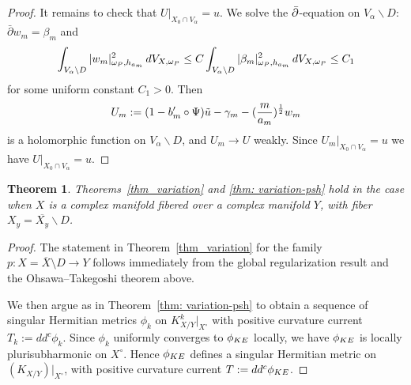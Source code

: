 \documentclass[a4paper, 11pt]{amsart}
\theoremstyle{plain}
\newtheorem{theorem}{Theorem}[section]
\numberwithin{equation}{section} %
\numberwithin{figure}{section} %
\theoremstyle{plain}
\theoremstyle{plain}
\theoremstyle{plain}
\theoremstyle{plain}
\theoremstyle{remark}
\theoremstyle{definition}
\theoremstyle{definition}
\begin{document}
\begin{proof}
It remains to check that $U|_{X_0\cap V_\alpha}=u$. We solve the $\Bar{\partial}$-equation on $V_\alpha\backslash D$: $\bar\partial w_m=\beta_m$ and
\[\int_{V_\alpha\backslash D}|w_m|^2_{\omega_{\rm P},h_{a_m}}\, {\rm d}V_{X,\omega_{\rm P}}\leq C\int_{V_\alpha\backslash D}|\beta_m|^2_{\omega_{\rm P},h_{a_m}}\, {\rm d}V_{X,\omega_{\rm P}}\leq C_1 \]
for some uniform constant $C_1>0$. Then \[U_m:=(1-b_m'\circ\Psi)\Tilde{u}-\gamma_m-(\frac{m}{a_m})^{\frac{1}{2}}w_m \]
is a holomorphic function on $V_\alpha\backslash D$, and $U_m\to U$ weakly. Since $U_m|_{X_0\cap V_\alpha}=u$ we have $U|_{X_0\cap V_\alpha}=u$. 
\end{proof}
\begin{theorem}\label{thm: variation-psh2}
    Theorems~\ref{thm_variation} and
    \ref{thm: variation-psh} hold in the case when $X$ is a complex manifold fibered over a complex manifold $Y$, with  fiber $X_y=\overline{X_y}\backslash D$. 
\end{theorem}
\begin{proof} The statement in Theorem~\ref{thm_variation} for the family $p:X=\overline{X}\setminus D\rightarrow Y$ follows immediately from the global regularization result and the Ohsawa--Takegoshi theorem above. 

    We then argue as in Theorem~\ref{thm: variation-psh} to obtain a sequence of singular Hermitian metrics $\phi_{k}$ on $K_{X/Y}^k|_{X^\circ}$ with positive curvature current $T_k:=dd^c \phi_k$.  
    Since $\phi_k$ uniformly converges to $\phi_{\rm KE}$ locally, we have $\phi_{\rm KE}$ is locally plurisubharmonic on $X^\circ$. Hence $\phi_{\rm KE}$ defines a singular Hermitian metric on $(K_{X/Y})|_{X^\circ}$, with positive curvature current {$T:= dd^c \phi_{\rm KE}$}.  
\end{proof}
\end{document}
